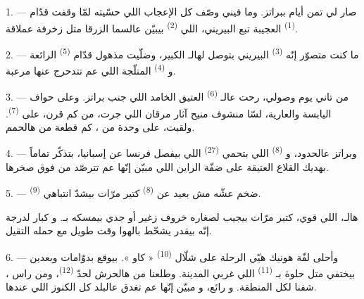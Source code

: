 \VUsaut{4.0mm}
\VUsaut{3.0mm}

\VUsaut{3.0mm}

\VUsaut{3.0mm}

1. --- صار لي تمن أيام ببراتز. وما فيني وصّف كل الإعجاب اللي حسّيته
لمّا وقفت قدّام  \textsuperscript{(1)} العجيبة تبع
البيريني، اللي  \textsuperscript{(2)} بيبيّن عالسما
الزرقا متل زخرفة عملاقة.

2. --- ما كنت متصوّر إنّه  \textsuperscript{(3)} البيريني
بتوصل لهالـ الكبير، وضلّيت مذهول قدّام  \textsuperscript{(5)} الرائعة و
\textsuperscript{(4)} المتلّجة اللي عم تتدحرج عنها  مرعبة.

\VUsaut{3.0mm}
\VUsaut{3.0mm}

3. --- من تاني يوم وصولي، رحت عالـ \textsuperscript{(6)}
العتيق الخامد اللي جنب براتز. وعلى حواف  اليابسة
والعارية، لسّا منشوف منيح آثار مرقان  اللي جرت، من كم
قرن، على  \textsuperscript{(7)}. ولقيت، على وحدة من
، كم قطعة من هالحمم.

4. --- وبراتز عالحدود، و \textsuperscript{(8)} اللي بتحمي
 \textsuperscript{(27)} اللي بيفصل فرنسا عن إسبانيا،
بتذكّر تماماً بهديك القلاع العتيقة على ضفّة الراين اللي مبيّن إنّها عم
تترصّد  من فوق صخرها.

5. ---  \textsuperscript{(9)} ضخم عشّه مش بعيد عن
 \textsuperscript{(8)} كتير مرّات بيشدّ انتباهي.

هالـ، اللي  قوي، كتير مرّات بيجيب
لصغاره خروف زغير أو جدي بيمسكه بـ. و
كبار لدرجة إنّه بيقدر يشحّط بالهوا وقت طويل مع حمله التقيل.

\VUsaut{3.0mm}
\VUsaut{3.0mm}

6. --- وأحلى لفّة هونيك هيّي الرحلة على شلّال \textsuperscript{(10)}
« كاو ».  بيوقع بدوّامات وبعدين بيختفي متل 
حلوة بـ \textsuperscript{(11)} اللي غربي المدينة.
وطلعنا من هالحرش لحدّ  \textsuperscript{(12)}، ومن
راس ، شفنا  لكل المنطقة.
و رائع، و مبيّن إنّها عم تغدق عالبلد كل
الكنوز اللي عندها.

